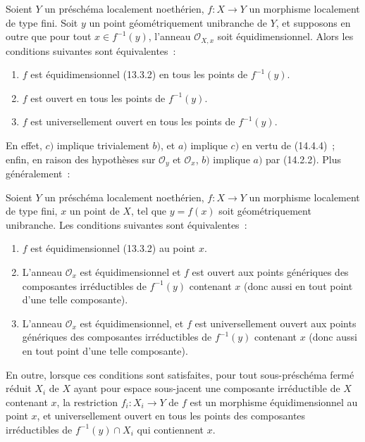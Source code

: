 
\begin{corollary}[14.4.6]
\label{IV.14.4.6-fr}
Soient $Y$ un préschéma localement noethérien, $f:X\to Y$ un morphisme localement
de type fini. Soit $y$ un point géométriquement unibranche de $Y$, et supposons en
outre que pour tout $x\in f^{-1}(y)$, l'anneau $\mathcal O_{X,x}$ soit
équidimensionnel. Alors les conditions suivantes sont équivalentes~:
\begin{enumerate}[label=\emph{\alph*)}]
  \item $f$ est équidimensionnel \textup{(13.3.2)} en tous les points de $f^{-1}(y)$.
  \item $f$ est ouvert en tous les points de $f^{-1}(y)$.
  \item $f$ est universellement ouvert en tous les points de $f^{-1}(y)$.
\end{enumerate}
\end{corollary}

En effet, $c)$ implique trivialement $b)$, et $a)$ implique $c)$ en vertu de
(14.4.4)~; enfin, en raison des hypothèses sur $\mathcal O_y$ et $\mathcal O_x$,
$b)$ implique $a)$ par (14.2.2). Plus généralement~:

\begin{proposition}[14.4.7]
\label{IV.14.4.7-fr}
Soient $Y$ un préschéma localement noethérien, $f:X\to Y$ un morphisme localement
de type fini, $x$ un point de $X$, tel que $y=f(x)$ soit géométriquement unibranche.
Les conditions suivantes sont équivalentes~:
\begin{enumerate}[label=\emph{\alph*)}]
  \item $f$ est équidimensionnel \textup{(13.3.2)} au point $x$.
  \item L'anneau $\mathcal O_x$ est équidimensionnel et $f$ est ouvert aux points
  génériques des composantes irréductibles de $f^{-1}(y)$ contenant $x$ (donc
  aussi en tout point d'une telle composante).
  \item L'anneau $\mathcal O_x$ est équidimensionnel, et $f$ est universellement
  ouvert aux points génériques des composantes irréductibles de $f^{-1}(y)$
  contenant $x$ (donc aussi en tout point d'une telle composante).
\end{enumerate}

En outre, lorsque ces conditions sont satisfaites, pour tout sous-préschéma fermé
réduit $X_i$ de $X$ ayant pour espace sous-jacent une composante irréductible de $X$
contenant $x$, la restriction $f_i:X_i\to Y$ de $f$ est un morphisme
équidimensionnel au point $x$, et universellement ouvert en tous les points des
composantes irréductibles de $f^{-1}(y)\cap X_i$ qui contiennent $x$.
\end{proposition}


